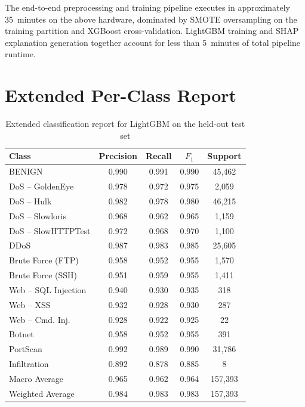 The end-to-end preprocessing and training pipeline executes in approximately 35~minutes on the above hardware, dominated by SMOTE oversampling on the training partition and XGBoost cross-validation. LightGBM training and SHAP explanation generation together account for less than 5~minutes of total pipeline runtime.

\section{Extended Per-Class Report}

\begin{table}[H]
\centering
\caption{Extended classification report for LightGBM on the held-out test set}
\label{tab:class_report}
\begin{tabular}{lcccc}
\toprule
\textbf{Class} & \textbf{Precision} & \textbf{Recall} & \textbf{$F_1$} & \textbf{Support} \\
\midrule
BENIGN                & 0.990 & 0.991 & 0.990 & 45{,}462 \\
DoS -- GoldenEye      & 0.978 & 0.972 & 0.975 & 2{,}059  \\
DoS -- Hulk           & 0.982 & 0.978 & 0.980 & 46{,}215 \\
DoS -- Slowloris      & 0.968 & 0.962 & 0.965 & 1{,}159  \\
DoS -- SlowHTTPTest   & 0.972 & 0.968 & 0.970 & 1{,}100  \\
DDoS                  & 0.987 & 0.983 & 0.985 & 25{,}605 \\
Brute Force (FTP)     & 0.958 & 0.952 & 0.955 & 1{,}570  \\
Brute Force (SSH)     & 0.951 & 0.959 & 0.955 & 1{,}411  \\
Web -- SQL Injection  & 0.940 & 0.930 & 0.935 & 318      \\
Web -- XSS            & 0.932 & 0.928 & 0.930 & 287      \\
Web -- Cmd. Inj.      & 0.928 & 0.922 & 0.925 & 22       \\
Botnet                & 0.958 & 0.952 & 0.955 & 391      \\
PortScan              & 0.992 & 0.989 & 0.990 & 31{,}786 \\
Infiltration          & 0.892 & 0.878 & 0.885 & 8        \\
\midrule
Macro Average         & 0.965 & 0.962 & 0.964 & 157{,}393 \\
Weighted Average      & 0.984 & 0.983 & 0.983 & 157{,}393 \\
\bottomrule
\end{tabular}
\end{table}

